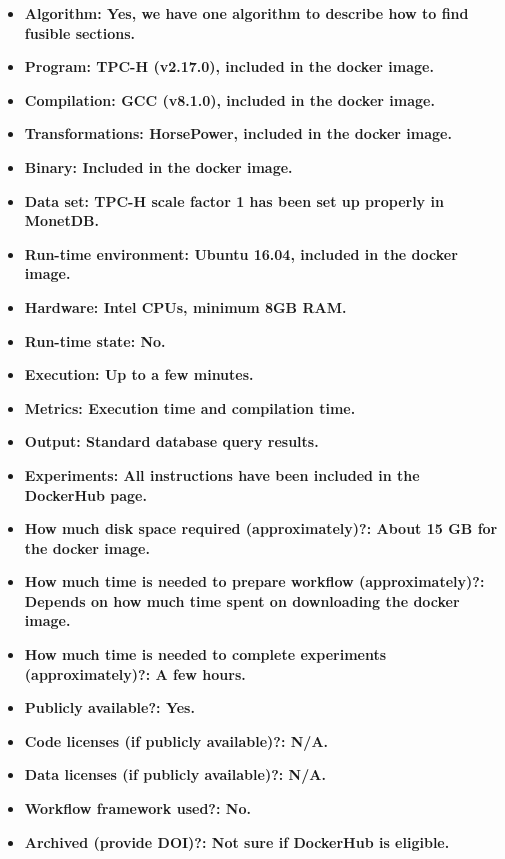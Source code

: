 
{\small
\begin{itemize}
  \item {\bf Algorithm: Yes, we have one algorithm to describe how to find fusible sections.}
  \item {\bf Program: TPC-H (v2.17.0), included in the docker image.}
  \item {\bf Compilation: GCC (v8.1.0), included in the docker image.}
  \item {\bf Transformations: HorsePower, included in the docker image.}
  \item {\bf Binary: Included in the docker image. }
  \item {\bf Data set: TPC-H scale factor 1 has been set up properly in MonetDB.}
  \item {\bf Run-time environment: Ubuntu 16.04, included in the docker image.}
  \item {\bf Hardware: Intel CPUs, minimum 8GB RAM.}
  \item {\bf Run-time state: No.}
  \item {\bf Execution: Up to a few minutes.}
  \item {\bf Metrics: Execution time and compilation time.}
  \item {\bf Output: Standard database query results.}
  \item {\bf Experiments: All instructions have been included in the DockerHub page.}
  \item {\bf How much disk space required (approximately)?: About 15 GB for the docker image.}
  \item {\bf How much time is needed to prepare workflow (approximately)?: Depends on how much time spent on downloading the docker image.}
  \item {\bf How much time is needed to complete experiments (approximately)?: A few hours.}
  \item {\bf Publicly available?: Yes.}
  \item {\bf Code licenses (if publicly available)?: N/A.}
  \item {\bf Data licenses (if publicly available)?: N/A.}
  \item {\bf Workflow framework used?: No.}
  \item {\bf Archived (provide DOI)?: Not sure if DockerHub is eligible.}
\end{itemize}

}
